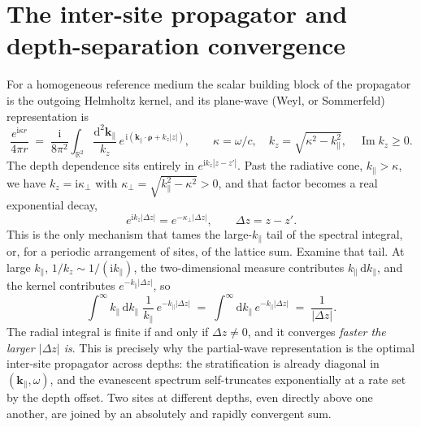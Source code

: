 \documentclass[11pt,a4paper]{article}
\newcommand{\rd}{\mathrm{d}}
\newcommand{\ii}{\mathrm{i}}
\newcommand{\Imm}{\operatorname{Im}}
\newcommand{\kpar}{\mathbf{k}_{\parallel}}
\newcommand{\brho}{\boldsymbol{\rho}}
\begin{document}
\section{The inter-site propagator and depth-separation convergence}

For a homogeneous reference medium the scalar building block of the propagator is the
outgoing Helmholtz kernel, and its plane-wave (Weyl, or Sommerfeld) representation is
\begin{equation}
\label{eq:weyl}
\frac{e^{\ii\kappa r}}{4\pi r}
\;=\;
\frac{\ii}{8\pi^{2}}\int_{\mathbb{R}^{2}}\frac{\rd^{2}\kpar}{k_z}\,
e^{\,\ii(\kpar\cdot\brho + k_z\lvert z\rvert)},
\qquad \kappa=\omega/c,\quad k_z=\sqrt{\kappa^{2}-k_\parallel^{2}}, \quad \Imm k_z\ge 0 .
\end{equation}
The depth dependence sits entirely in $e^{\ii k_z|z-z'|}$. Past the radiative cone,
$k_\parallel>\kappa$, we have $k_z=\ii\kappa_\perp$ with $\kappa_\perp=\sqrt{k_\parallel^{2}-\kappa^{2}}>0$,
and that factor becomes a real exponential decay,
\begin{equation}
e^{\ii k_z|\Delta z|}=e^{-\kappa_\perp|\Delta z|}, \qquad \Delta z = z-z'.
\end{equation}
This is the only mechanism that tames the large-$k_\parallel$ tail of the spectral integral, or,
for a periodic arrangement of sites, of the lattice sum. Examine that tail. At large
$k_\parallel$, $1/k_z\sim 1/(\ii k_\parallel)$, the two-dimensional measure contributes
$k_\parallel\,\rd k_\parallel$, and the kernel contributes $e^{-k_\parallel|\Delta z|}$, so
\begin{equation}
\label{eq:tail}
\int^{\infty}\! k_\parallel\,\rd k_\parallel \;\frac{1}{k_\parallel}\,e^{-k_\parallel|\Delta z|}
\;=\;
\int^{\infty}\!\rd k_\parallel\,e^{-k_\parallel|\Delta z|}
\;=\;
\frac{1}{|\Delta z|}.
\end{equation}
The radial integral is finite if and only if $\Delta z\neq 0$, and it converges \emph{faster
the larger $|\Delta z|$ is}. This is precisely why the partial-wave representation is the
optimal inter-site propagator across depths: the stratification is already diagonal in
$(\kpar,\omega)$, and the evanescent spectrum self-truncates exponentially at a rate set by
the depth offset. Two sites at different depths, even directly above one another, are joined
by an absolutely and rapidly convergent sum.
\end{document}

